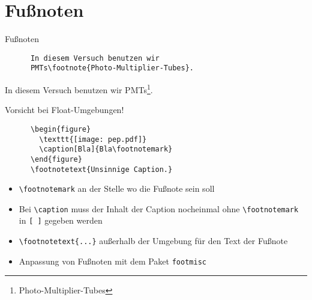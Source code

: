 \section{Fußnoten}

\begin{frame}[fragile]{Fußnoten}
  \begin{CodeExample}{0.5}
    \begin{lstlisting}
      In diesem Versuch benutzen wir 
      PMTs\footnote{Photo-Multiplier-Tubes}.
    \end{lstlisting}
    \CodeResult
    In diesem Versuch benutzen wir PMTs\footnote{Photo-Multiplier-Tubes}.
  \end{CodeExample}

  \begin{alertblock}{Vorsicht bei Float-Umgebungen!}
    \begin{lstlisting}
      \begin{figure}
        \texttt{[image: pep.pdf]}
        \caption[Bla]{Bla\footnotemark}
      \end{figure}
      \footnotetext{Unsinnige Caption.}
    \end{lstlisting}
  \end{alertblock}
  \vspace{-1pt}
  \begin{itemize}
    \item \lstinline+\footnotemark+ an der Stelle wo die Fußnote sein soll
    \item Bei \lstinline+\caption+ muss der Inhalt der Caption nocheinmal
        ohne \lstinline+\footnotemark+ in \lstinline+[ ]+ gegeben werden
    \item \lstinline+\footnotetext{...}+ außerhalb der Umgebung für den Text der Fußnote
    \item Anpassung von Fußnoten mit dem Paket \texttt{footmisc}
  \end{itemize}
\end{frame}
